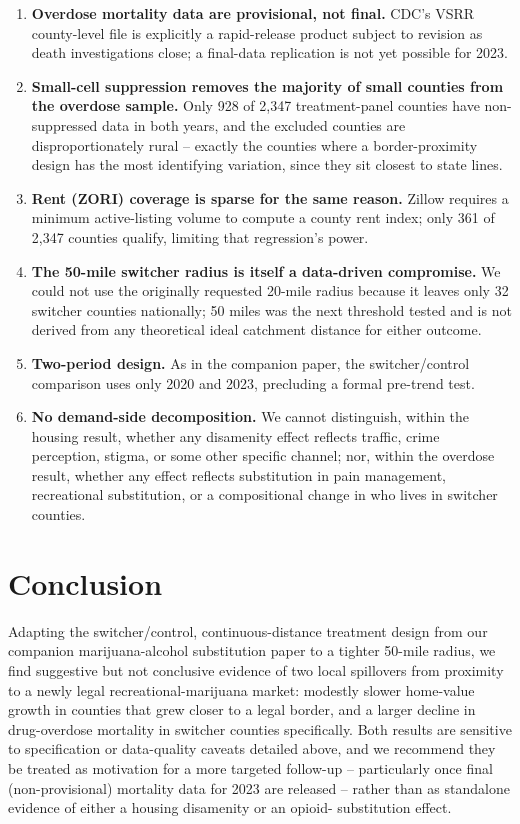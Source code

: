 \documentclass[11pt]{article}
\begin{document}
\begin{enumerate}[label=(\arabic*), leftmargin=*]
\item \textbf{Overdose mortality data are provisional, not final.}
CDC's VSRR county-level file is explicitly a rapid-release product
subject to revision as death investigations close; a final-data
replication is not yet possible for 2023.
\item \textbf{Small-cell suppression removes the majority of small
counties from the overdose sample.} Only 928 of 2,347 treatment-panel
counties have non-suppressed data in both years, and the excluded
counties are disproportionately rural -- exactly the counties where a
border-proximity design has the most identifying variation, since they
sit closest to state lines.
\item \textbf{Rent (ZORI) coverage is sparse for the same reason.}
Zillow requires a minimum active-listing volume to compute a county
rent index; only 361 of 2,347 counties qualify, limiting that
regression's power.
\item \textbf{The 50-mile switcher radius is itself a data-driven
compromise.} We could not use the originally requested 20-mile radius
because it leaves only 32 switcher counties nationally; 50 miles was
the next threshold tested and is not derived from any theoretical
ideal catchment distance for either outcome.
\item \textbf{Two-period design.} As in the companion paper, the
switcher/control comparison uses only 2020 and 2023, precluding a
formal pre-trend test.
\item \textbf{No demand-side decomposition.} We cannot distinguish,
within the housing result, whether any disamenity effect reflects
traffic, crime perception, stigma, or some other specific channel; nor,
within the overdose result, whether any effect reflects substitution
in pain management, recreational substitution, or a compositional
change in who lives in switcher counties.
\end{enumerate}

\section{Conclusion}

Adapting the switcher/control, continuous-distance treatment design
from our companion marijuana-alcohol substitution paper to a tighter
50-mile radius, we find
suggestive but not conclusive evidence of two local spillovers from
proximity to a newly legal recreational-marijuana market: modestly
slower home-value growth in counties that grew closer to a legal
border, and a larger decline in drug-overdose mortality in switcher
counties specifically. Both results are sensitive to specification or
data-quality caveats detailed above, and we recommend they be treated
as motivation for a more targeted follow-up -- particularly once final
(non-provisional) mortality data for 2023 are released -- rather than
as standalone evidence of either a housing disamenity or an opioid-
substitution effect.



\end{document}
